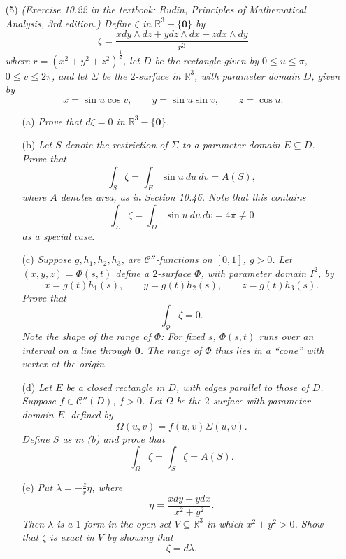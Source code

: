 \documentclass{article}
\begin{document}
\begin{enumerate}
\item[(5)]
  \emph{(Exercise 10.22 in the textbook:
  Rudin, Principles of Mathematical Analysis, 3rd edition.)
  Define $\zeta$ in $\mathbb{R}^3-\{\mathbf{0}\}$ by
  \[
    \zeta = \frac{x dy \wedge dz + y dz \wedge dx + z dx \wedge dy}{r^3}
  \]
  where $r = (x^2+y^2+z^2)^{\frac{1}{2}}$,
  let $D$ be the rectangle given by $0 \leq u \leq \pi$, $0 \leq v \leq 2\pi$,
  and let $\Sigma$ be the $2$-surface in $\mathbb{R}^3$,
  with parameter domain $D$, given by
  \[
    x = \sin u \cos v,
    \qquad
    y = \sin u \sin v,
    \qquad
    z = \cos u.
  \]}
  \begin{enumerate}
  \item[(a)]
    \emph{Prove that $d\zeta = 0$ in $\mathbb{R}^3 - \{ \mathbf{0} \}$.}

  \item[(b)]
    \emph{Let $S$ denote the restriction of $\Sigma$ to a parameter domain $E \subseteq D$.
    Prove that
    \[
      \int_{S} \zeta
      = \int_{E} \sin u \: du \: dv
      = A(S),
    \]
    where $A$ denotes area, as in Section 10.46.
    Note that this contains
    \[
      \int_{\Sigma} \zeta
      = \int_{D} \sin u \: du \: dv
      = 4\pi \neq 0
    \]
    as a special case.}

  \item[(c)]
    \emph{Suppose $g, h_1, h_2, h_3$, are $\mathcal{C}''$-functions on $[0,1]$, $g > 0$.
    Let $(x,y,z) = \Phi(s,t)$ define a $2$-surface $\Phi$,
    with parameter domain $I^2$, by
    \[
      x = g(t)h_1(s),
      \qquad
      y = g(t)h_2(s),
      \qquad
      z = g(t)h_3(s).
    \]
    Prove that
    \[
      \int_{\Phi} \zeta = 0.
    \]
    Note the shape of the range of $\Phi$:
    For fixed $s$, $\Phi(s,t)$ runs over an interval on a line through $\mathbf{0}$.
    The range of $\Phi$ thus lies in a ``cone'' with vertex at the origin.}

  \item[(d)]
    \emph{Let $E$ be a closed rectangle in $D$, with edges parallel to those of $D$.
    Suppose $f \in \mathcal{C}''(D)$, $f > 0$.
    Let $\Omega$ be the $2$-surface with parameter domain $E$,
    defined by
    \[
      \Omega(u,v) = f(u,v)\Sigma(u,v).
    \]
    Define $S$ as in (b) and prove that}
    \[
      \int_{\Omega} \zeta = \int_{S} \zeta = A(S).
    \]

  \item[(e)]
    \emph{Put $\lambda = -\frac{z}{r}\eta$, where
    \[
      \eta = \frac{xdy-ydx}{x^2+y^2}.
    \]
    Then $\lambda$ is a $1$-form in the open set $V \subseteq \mathbb{R}^3$ in which $x^2+y^2 > 0$.
    Show that $\zeta$ is exact in $V$ by showing that}
    \[
      \zeta = d\lambda.
    \]


\end{enumerate}
\end{enumerate}
\end{document}
